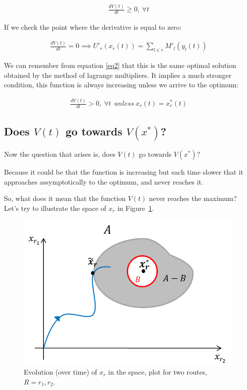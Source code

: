 \begin{equation}
\begin{aligned}
\frac{dV(t)}{dt} \geq 0,\ \forall t
\end{aligned}
\label{eq33}
\end{equation}

If we check the point where the derivative is equal to zero:

\begin{equation}
\begin{aligned}
\frac{dV(t)}{dt} = 0 \implies U'_r(x_r(t)) = \sum_{l \in {r}} M'_l(y_l(t))
\end{aligned}
\label{eq34}
\end{equation}

We can remember from equation \eqref{eq2} that this is the same optimal solution obtained by the method of lagrange multipliers. It implies a much stronger condition, this function is always increasing unless we arrive to the optimum:

\begin{equation}
\begin{aligned}
\frac{dV(t)}{dt} > 0,\ \forall t \ \ unless \  x_r(t) = x_r^*(t)
\end{aligned}
\label{eq35}
\end{equation}

\subsection{Does $V(t)$ go towards $V(x^*)$?}
Now the question that arises is, does $V(t)$ go towards $V(x^*)$?

Because it could be that the function is increasing but each time slower that it approaches assymptotically to the optimum, and never reaches it.

So, what does it mean that the function $V(t)$ never reaches the maximum?
Let's try to illustrate the space of $x_r$ in Figure~\ref{figur9}.

\begin{figure}[h!]
\centering
\includegraphics[scale=.7]{ball}
\caption{Evolution (over time) of $x_r$ in the space, plot for two routes, $R = {r_1,r_2}$.}
\label{figur9}
\end{figure}

